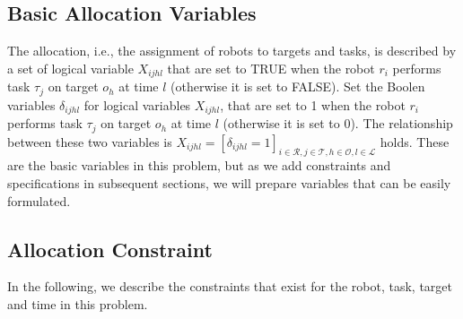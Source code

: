 \documentclass[]{interact}
\theoremstyle{plain}%
\theoremstyle{definition}
\theoremstyle{remark}
\begin{document}
    
\subsection{Basic Allocation Variables}
The allocation, i.e., the assignment of robots to targets and tasks, is described by a set of logical variable $X_{ijhl}$ that are set to TRUE when the robot $r_i$ performs task $\tau_j$ on target $o_h$ at time $l$ (otherwise it is set to FALSE).
Set the Boolen variables $\delta_{ijhl}$ for logical variables $X_{ijhl}$, that are set to 1 when the robot $r_i$ performs task $\tau_j$ on target $o_h$ at time $l$ (otherwise it is set to 0).
The relationship between these two variables is $X_{ijhl}=[\delta_{ijhl}=1]_{i\in\mathcal{R},j\in\mathcal{T},h\in\mathcal{O},l\in\mathcal{L}}$ holds.
These are the basic variables in this problem, but as we add constraints and specifications in subsequent sections, we will prepare variables that can be easily formulated.

\subsection{Allocation Constraint}
In the following, we describe the constraints that exist for the robot, task, target and time in this problem.
\end{document}
